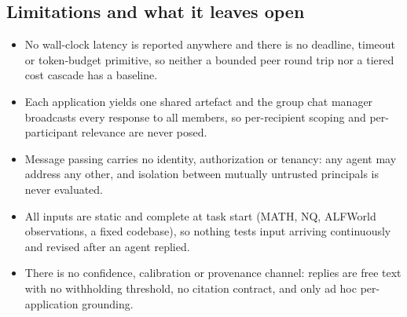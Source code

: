 \subsection{Limitations and what it leaves open}
\begin{itemize}[leftmargin=*,itemsep=0pt,topsep=2pt,parsep=0pt]
  \item No wall-clock latency is reported anywhere and there is no deadline, timeout or token-budget primitive, so neither a bounded peer round trip nor a tiered cost cascade has a baseline.
  \item Each application yields one shared artefact and the group chat manager broadcasts every response to all members, so per-recipient scoping and per-participant relevance are never posed.
  \item Message passing carries no identity, authorization or tenancy: any agent may address any other, and isolation between mutually untrusted principals is never evaluated.
  \item All inputs are static and complete at task start (MATH, NQ, ALFWorld observations, a fixed codebase), so nothing tests input arriving continuously and revised after an agent replied.
  \item There is no confidence, calibration or provenance channel: replies are free text with no withholding threshold, no citation contract, and only ad hoc per-application grounding.
\end{itemize}
